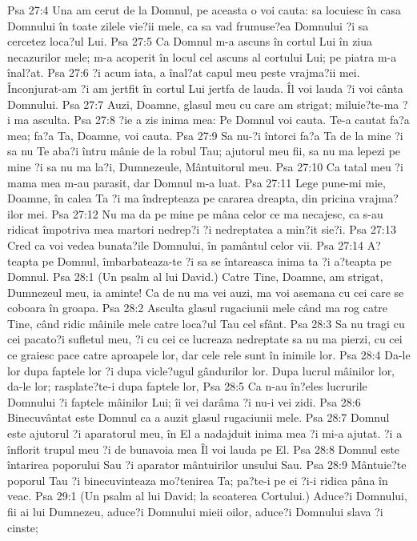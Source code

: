 Psa 27:4  Una am cerut de la Domnul, pe aceasta o voi cauta: sa locuiesc în casa Domnului în toate zilele vie?ii mele, ca sa vad frumuse?ea Domnului ?i sa cercetez loca?ul Lui.
Psa 27:5  Ca Domnul m-a ascuns în cortul Lui în ziua necazurilor mele; m-a acoperit în locul cel ascuns al cortului Lui; pe piatra m-a înal?at.
Psa 27:6  ?i acum iata, a înal?at capul meu peste vrajma?ii mei. Înconjurat-am ?i am jertfit în cortul Lui jertfa de lauda. Îl voi lauda ?i voi cânta Domnului.
Psa 27:7  Auzi, Doamne, glasul meu cu care am strigat; miluie?te-ma ?i ma asculta.
Psa 27:8  ?ie a zis inima mea: Pe Domnul voi cauta. Te-a cautat fa?a mea; fa?a Ta, Doamne, voi cauta.
Psa 27:9  Sa nu-?i întorci fa?a Ta de la mine ?i sa nu Te aba?i întru mânie de la robul Tau; ajutorul meu fii, sa nu ma lepezi pe mine ?i sa nu ma la?i, Dumnezeule, Mântuitorul meu.
Psa 27:10  Ca tatal meu ?i mama mea m-au parasit, dar Domnul m-a luat.
Psa 27:11  Lege pune-mi mie, Doamne, în calea Ta ?i ma îndrepteaza pe cararea dreapta, din pricina vrajma?ilor mei.
Psa 27:12  Nu ma da pe mine pe mâna celor ce ma necajesc, ca s-au ridicat împotriva mea martori nedrep?i ?i nedreptatea a min?it sie?i.
Psa 27:13  Cred ca voi vedea bunata?ile Domnului, în pamântul celor vii.
Psa 27:14  A?teapta pe Domnul, îmbarbateaza-te ?i sa se întareasca inima ta ?i a?teapta pe Domnul.
Psa 28:1  (Un psalm al lui David.) Catre Tine, Doamne, am strigat, Dumnezeul meu, ia aminte! Ca de nu ma vei auzi, ma voi asemana cu cei care se coboara în groapa.
Psa 28:2  Asculta glasul rugaciunii mele când ma rog catre Tine, când ridic mâinile mele catre loca?ul Tau cel sfânt.
Psa 28:3  Sa nu tragi cu cei pacato?i sufletul meu, ?i cu cei ce lucreaza nedreptate sa nu ma pierzi, cu cei ce graiesc pace catre aproapele lor, dar cele rele sunt în inimile lor.
Psa 28:4  Da-le lor dupa faptele lor ?i dupa vicle?ugul gândurilor lor. Dupa lucrul mâinilor lor, da-le lor; rasplate?te-i dupa faptele lor,
Psa 28:5  Ca n-au în?eles lucrurile Domnului ?i faptele mâinilor Lui; îi vei darâma ?i nu-i vei zidi.
Psa 28:6  Binecuvântat este Domnul ca a auzit glasul rugaciunii mele.
Psa 28:7  Domnul este ajutorul ?i aparatorul meu, în El a nadajduit inima mea ?i mi-a ajutat. ?i a înflorit trupul meu ?i de bunavoia mea Îl voi lauda pe El.
Psa 28:8  Domnul este întarirea poporului Sau ?i aparator mântuirilor unsului Sau.
Psa 28:9  Mântuie?te poporul Tau ?i binecuvinteaza mo?tenirea Ta; pa?te-i pe ei ?i-i ridica pâna în veac.
Psa 29:1  (Un psalm al lui David; la scoaterea Cortului.) Aduce?i Domnului, fii ai lui Dumnezeu, aduce?i Domnului mieii oilor, aduce?i Domnului slava ?i cinste;
